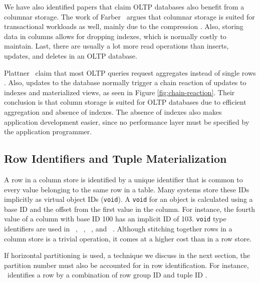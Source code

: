 We have also identified papers that claim OLTP databases also benefit from a columnar storage. The work of Farber \ea~argues that columnar storage is suited for transactional workloads as well, mainly due to the compression \cite{Farber2012-vh}. Also, storing data in columns allows for dropping indexes, which is normally costly to maintain. Last, there are usually a lot more read operations than inserts, updates, and deletes in an OLTP database.

Plattner \ea~claim that most OLTP queries request aggregates instead of single rows \cite{Plattner2014-fr}. Also, updates to the database normally trigger a chain reaction of updates to indexes and materialized views, as seen in Figure \ref{fig:chain-reaction}. Their conclusion is that column storage is suited for OLTP databases due to efficient aggregation and absence of indexes. The absence of indexes also makes application development easier, since no performance layer must be specified by the application programmer. 

\subsection{Row Identifiers and Tuple Materialization}
\label{sub:Row Identifiers and Tuple Materialization}
A row in a column store is identified by a unique identifier that is common to every value belonging to the same row in a table. Many systems store these IDs implicitly as virtual object IDs (\texttt{void}). A \texttt{void} for an object is calculated using a base ID and the offset from the first value in the column. For instance, the fourth value of a column with base ID 100 has an implicit ID of 103. \texttt{void} type identifiers are used in \monetdb~\cite{Boncz2002-yj}, \cstore~\cite{Stonebraker2005-qz}, \vertica~\cite{Lamb2012-kg}, and \ibm~\cite{Raman2013-em}. Although stitching together rows in a column store is a trivial operation, it comes at a higher cost than in a row store. 

If horizontal partitioning is used, a technique we discuss in the next section, the partition number must also be accounted for in row identification. For instance, \mssql~identifies a row by a combination of row group ID and tuple ID \cite{Larson2013-mc}.

